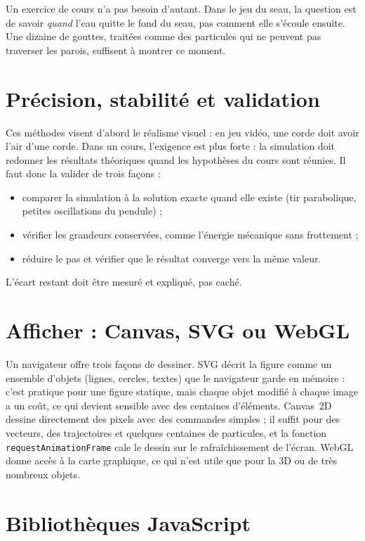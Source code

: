 Un exercice de cours n'a pas besoin d'autant. Dans le jeu du seau, la
question est de savoir \emph{quand} l'eau quitte le fond du seau, pas comment
elle s'écoule ensuite. Une dizaine de gouttes, traitées comme des
particules qui ne peuvent pas traverser les parois, suffisent à montrer ce
moment.

\section{Précision, stabilité et validation}

Ces méthodes visent d'abord le réalisme visuel : en jeu vidéo, une corde doit
avoir l'air d'une corde. Dans un cours, l'exigence est plus forte : la
simulation doit redonner les résultats théoriques quand les hypothèses du
cours sont réunies. Il faut donc la valider de trois façons :
\begin{itemize}
  \item comparer la simulation à la solution exacte quand elle existe
        (tir parabolique, petites oscillations du pendule) ;
  \item vérifier les grandeurs conservées, comme l'énergie mécanique sans
        frottement ;
  \item réduire le pas et vérifier que le résultat converge vers la même
        valeur.
\end{itemize}
L'écart restant doit être mesuré et expliqué, pas caché.

\section{Afficher : Canvas, SVG ou WebGL}

Un navigateur offre trois façons de dessiner. SVG décrit la figure comme un
ensemble d'objets (lignes, cercles, textes) que le navigateur garde en
mémoire : c'est pratique pour une figure statique, mais chaque objet modifié
à chaque image a un coût, ce qui devient sensible avec des centaines
d'éléments. Canvas~2D dessine directement des pixels avec des commandes
simples \cite{whatwg_html} ; il suffit pour des vecteurs, des trajectoires et
quelques centaines de particules, et la fonction
\texttt{requestAnimationFrame} cale le dessin sur le rafraîchissement de
l'écran. WebGL donne accès à la carte graphique, ce qui n'est utile que pour
la 3D ou de très nombreux objets.

\section{Bibliothèques JavaScript}

